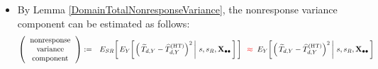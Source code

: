 \begin{itemize}
\begin{eqnarray*}
        \right.
        \!\!\right]
    \\
    & = &
        {\color{blue}
        \widehat{V}^{\textnormal{(HT)}}(\,s\,;\dbullet\widetilde{y}_{\bullet}\,)
        \;+\;
        \underset{k \in s_{M}}{\sum}\;
        d_{k}
        \left(1-\dfrac{1}{w_{k}}\right)
        w_{k}^{2}\,\sigma_{k}^{2}
        }\,,
    \end{eqnarray*}
    where
    \,$\widehat{V}^{\textnormal{(HT)}}(\,s\,;\dydot\,)$\,
    is the (design-unbiased) Horvitz-Thompson estimator for sampling variance, i.e.,
    \begin{equation*}
    \widehat{V}^{\textnormal{(HT)}}(\,s\,;\dydot\,)
    \;\; := \;\;
        \underset{k \in s}{\sum}\,
        \underset{l \in s}{\sum}\,
        \dfrac{\pi_{kl} - \pi_{k}\pi_{l}}{\pi_{kl}}\,
        (w_{k}d_{k}y_{k})\,(w_{l}d_{l}y_{l})\,,
    \end{equation*}
    and
    \begin{equation*}
    \widetilde{y}_{k}
    \;\; := \;\;
        \left\{\begin{array}{cl}
            y_{k}, & \textnormal{for \,$k \,\in\, s_{R}$}
            \\
            \overset{{\color{white}\textnormal{\large1}}}{\mu_{k}}, & \textnormal{for \,$k \,\in\, s_{M} \,:=\, s \,\backslash\, s_{R}$}
            \end{array}\right.
    \end{equation*}
\item
    By Lemma \ref{DomainTotalNonresponseVariance},
    the nonresponse variance component can be estimated as follows:
    \begin{eqnarray*}
    \left(\!\begin{array}{c}
        \textnormal{nonresponse}
        \\
        \textnormal{variance}
        \\
        \textnormal{{\color{white}..}component{\color{white}..}}
        \end{array}\!\right)
    & := &
        E_{SR}\!\left[\,
        E_{Y}\!\left[
            \left.
            \left(\,\widetilde{T}_{d,Y} - \widehat{T}^{\textnormal{(HT)}}_{d,Y}\right)^{2}
            \,\right\vert\,
            s,s_{R},\Xobs
            \,\right]
            \,\right]
    \;\; {\color{red}\approx} \;\;
        E_{Y}\!\left[
            \left.
            \left(\,\widetilde{T}_{d,Y} - \widehat{T}^{\textnormal{(HT)}}_{d,Y}\right)^{2}
            \,\right\vert\,
            s,s_{R},\Xobs
            \,\right]
    \\

\end{eqnarray*}
\end{itemize}
